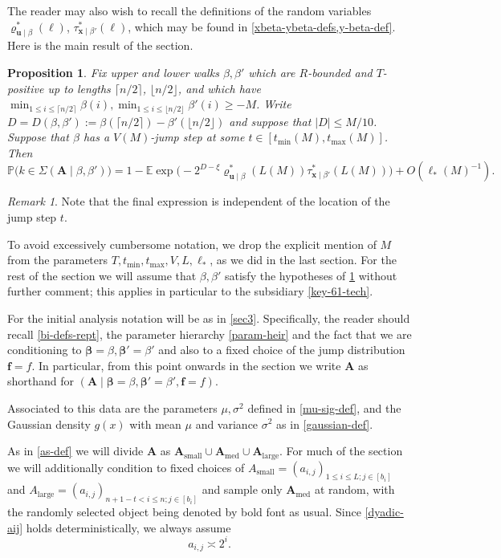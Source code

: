 \documentclass[11pt,reqno]{amsart}
\numberwithin{equation}{section}
\newtheorem{proposition}[theorem]{Proposition}
\theoremstyle{definition}
\theoremstyle{remark}
\newtheorem*{remark}{Remark}
\newcommand{\mb}{\mathbb}
\newcommand{\mbf}{\mathbf}
\def\boldbeta{\boldsymbol\beta}
\renewcommand{\le}{\leqslant}
\renewcommand{\ge}{\geqslant}
\def\sml{\operatorname{small}}
\def\lrg{\operatorname{large}}
\def\med{\operatorname{med}}
\begin{document}
The reader may also wish to recall the definitions of the random variables $\varrho^*_{\mbf{u} \mid \beta}(\ell)$, $\tau^*_{\mbf{x} \mid \beta'}(\ell)$, which may be found in \cref{xbeta-ybeta-defs,y-beta-def}. Here is the main result of the section.

\begin{proposition}\label{sec6-main}
Fix upper and lower walks $\beta, \beta'$ which are $R$-bounded and $T$-positive up to lengths $\lceil n/2\rceil$, $\lfloor n/2\rfloor$, and which have $\min_{1 \le i \le \lceil n/2\rceil} \beta(i), \min_{1 \le i \le \lfloor n/2\rfloor} \beta'(i) \ge -M$. Write $D  = D(\beta, \beta') := \beta(\lceil n/2\rceil) - \beta'(\lfloor n/2\rfloor)$ and suppose that $|D| \le M/10$. Suppose that $\beta$ has a $V(M)$-jump step at some $t \in [t_{\min}(M), t_{\max}(M)]$. Then
\[ \mb{P}\big(k \in \Sigma(\mbf{A} \mid \beta, \beta')\big) = 1 - \mb{E} \exp \big( -2^{D - \xi}  \varrho^*_{\mbf{u} \mid \beta}(L(M))\tau^*_{\mbf{x} \mid \beta'}(L(M))\big) + O(\ell_*(M)^{-1}).\] 
\end{proposition}
\begin{remark}
Note that the final expression is independent of the location of the jump step $t$.    
\end{remark}
To avoid excessively cumbersome notation, we drop the explicit mention of $M$ from the parameters $T, t_{\min}, t_{\max}, V, L, \ell_*$, as we did in the last section. For the rest of the section we will assume that $\beta, \beta'$ satisfy the hypotheses of \cref{sec6-main} without further comment; this applies in particular to the subsidiary \cref{key-61-tech}.

For the initial analysis notation will be as in \cref{sec3}. Specifically, the reader should recall \cref{bi-defs-rept}, the parameter hierarchy \cref{param-heir} and the fact that we are conditioning to $\boldbeta = \beta, \boldbeta' = \beta'$ and also to a fixed choice of the jump distribution $\mbf{f} = f$. In particular, from this point onwards in the section we write $\mbf{A}$ as shorthand for $(\mbf{A} \mid \boldbeta = \beta, \boldbeta' = \beta', \mathbf{f} = f)$.

Associated to this data are the parameters $\mu, \sigma^2$ defined in \cref{mu-sig-def}, and the Gaussian density $g(x)$ with mean $\mu$ and variance $\sigma^2$ as in \cref{gaussian-def}.

As in \cref{as-def} we will divide $\mbf{A}$ as $\mbf{A}_{\sml} \cup \mbf{A}_{\med} \cup  \mbf{A}_{\lrg}$. For much of the section we will additionally condition to fixed choices of $A_{\sml} = (a_{i,j})_{1 \le i \le L;j \in [b_i]}$ and $A_{\lrg} = (a_{i,j})_{n + 1 - t < i \le n;j \in [b_i]}$ and sample only $\mbf{A}_{\med}$ at random, with the randomly selected object being denoted by bold font as usual. Since \cref{dyadic-aij} holds deterministically, we always assume
\begin{equation*} a_{i,j} \asymp 2^{i}.\end{equation*}
\end{document}
